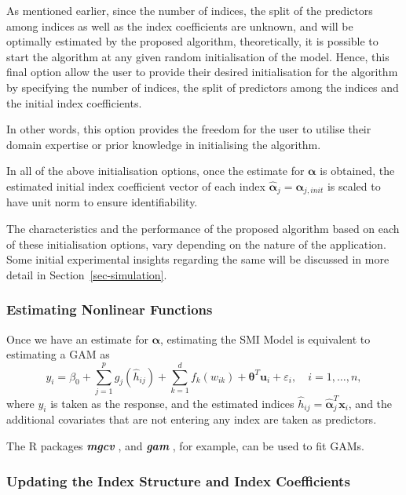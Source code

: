 \documentclass[11pt,a4paper,]{article}
\begin{document}
As mentioned earlier, since the number of indices, the split of the
predictors among indices as well as the index coefficients are unknown,
and will be optimally estimated by the proposed algorithm,
theoretically, it is possible to start the algorithm at any given random
initialisation of the model. Hence, this final option allow the user to
provide their desired initialisation for the algorithm by specifying the
number of indices, the split of predictors among the indices and the
initial index coefficients.

In other words, this option provides the freedom for the user to utilise
their domain expertise or prior knowledge in initialising the algorithm.

In all of the above initialisation options, once the estimate for
\(\bm{\alpha}\) is obtained, the estimated initial index coefficient
vector of each index \(\hat{\bm{\alpha}}_{j} = \bm{\alpha}_{j, init}\)
is scaled to have unit norm to ensure identifiability.

The characteristics and the performance of the proposed algorithm based
on each of these initialisation options, vary depending on the nature of
the application. Some initial experimental insights regarding the same
will be discussed in more detail in Section~\ref{sec-simulation}.

\hypertarget{sec-step2}{%
\subsubsection{Estimating Nonlinear Functions}\label{sec-step2}}

Once we have an estimate for \(\bm{\alpha}\), estimating the SMI Model
is equivalent to estimating a GAM as \[
  y_{i} = \beta_{0} + \sum_{j = 1}^{p}g_{j}(\hat{h}_{ij}) + \sum_{k = 1}^{d}f_{k}(w_{ik}) + \bm{\theta}^{T}\bm{u}_{i} + \varepsilon_{i}, \quad i = 1, \dots, n,
\] where \(y_{i}\) is taken as the response, and the estimated indices
\(\hat{h}_{ij} = \hat{\bm{\alpha}}_{j}^{T}\bm{x}_{i}\), and the
additional covariates that are not entering any index are taken as
predictors.

The R packages \textbf{\emph{mgcv}} \autocite{Wood2011}, and
\textbf{\emph{gam}} \autocite{Hastie2023}, for example, can be used to
fit GAMs.

\hypertarget{sec-step3}{%
\subsubsection{Updating the Index Structure and Index
Coefficients}\label{sec-step3}}
\end{document}
